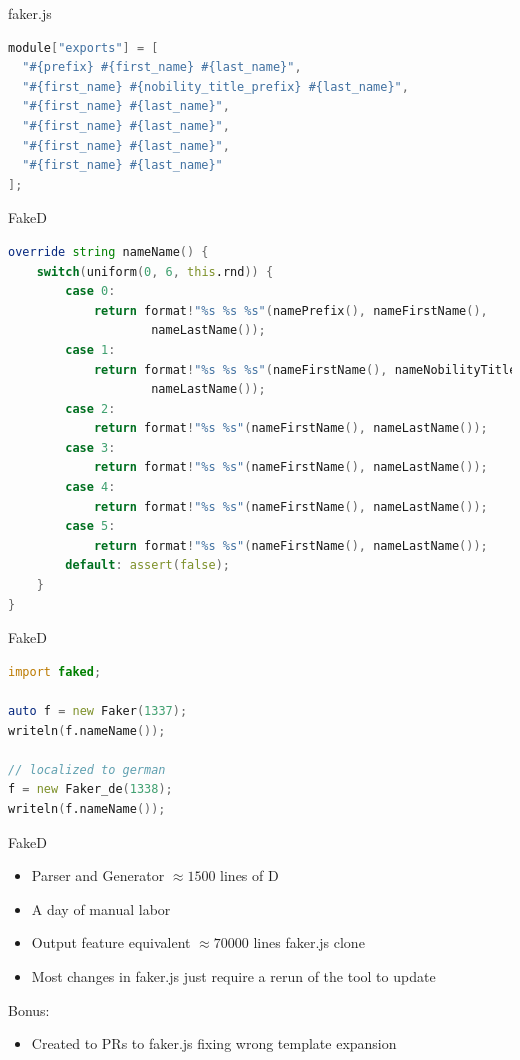 \documentclass[aspectratio=169,notes]{beamer}
\begin{document}
	\begin{frame}[fragile]{faker.js}
		\begin{lstlisting}[language=Java,caption={locales/de/name/name.js}]
module["exports"] = [
  "#{prefix} #{first_name} #{last_name}",
  "#{first_name} #{nobility_title_prefix} #{last_name}",
  "#{first_name} #{last_name}",
  "#{first_name} #{last_name}",
  "#{first_name} #{last_name}",
  "#{first_name} #{last_name}"
];\end{lstlisting}
	\end{frame}

	\begin{frame}[fragile]{FakeD}
\begin{lstlisting}[language=D,basicstyle=\scriptsize\ttfamily]
override string nameName() {
	switch(uniform(0, 6, this.rnd)) {
		case 0:
			return format!"%s %s %s"(namePrefix(), nameFirstName(), 
					nameLastName());
		case 1:
			return format!"%s %s %s"(nameFirstName(), nameNobilityTitlePrefix(), 
					nameLastName());
		case 2:
			return format!"%s %s"(nameFirstName(), nameLastName());
		case 3:
			return format!"%s %s"(nameFirstName(), nameLastName());
		case 4:
			return format!"%s %s"(nameFirstName(), nameLastName());
		case 5:
			return format!"%s %s"(nameFirstName(), nameLastName());
		default: assert(false);
	}
}
\end{lstlisting}
	\end{frame}

	\begin{frame}[fragile]{FakeD}
\begin{lstlisting}[language=D]
import faked;

auto f = new Faker(1337);
writeln(f.nameName());

// localized to german
f = new Faker_de(1338);
writeln(f.nameName());
\end{lstlisting}
	\end{frame}

	\begin{frame}[fragile]{FakeD}
		\Large
		\begin{itemize}
			\item Parser and Generator $\approx 1500$ lines of D
			\item A day of manual labor
			\item Output feature equivalent $\approx 70000$ lines faker.js clone
			\item Most changes in faker.js just require a rerun of the tool to update
		\end{itemize}
		\pause
		Bonus:
		\begin{itemize}
			\item Created to PRs to faker.js fixing wrong template expansion	
		\end{itemize}
	\end{frame}
\end{document}
